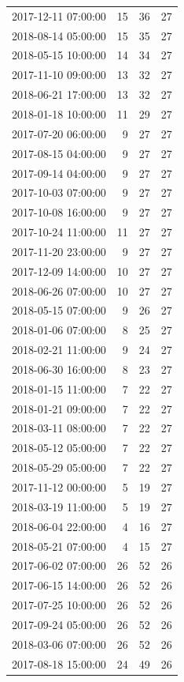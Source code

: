 \begin{tabular}{lrrr}
2017-12-11 07:00:00 & 15 & 36 & 27 \\
2018-08-14 05:00:00 & 15 & 35 & 27 \\
2018-05-15 10:00:00 & 14 & 34 & 27 \\
2017-11-10 09:00:00 & 13 & 32 & 27 \\
2018-06-21 17:00:00 & 13 & 32 & 27 \\
2018-01-18 10:00:00 & 11 & 29 & 27 \\
2017-07-20 06:00:00 & 9 & 27 & 27 \\
2017-08-15 04:00:00 & 9 & 27 & 27 \\
2017-09-14 04:00:00 & 9 & 27 & 27 \\
2017-10-03 07:00:00 & 9 & 27 & 27 \\
2017-10-08 16:00:00 & 9 & 27 & 27 \\
2017-10-24 11:00:00 & 11 & 27 & 27 \\
2017-11-20 23:00:00 & 9 & 27 & 27 \\
2017-12-09 14:00:00 & 10 & 27 & 27 \\
2018-06-26 07:00:00 & 10 & 27 & 27 \\
2018-05-15 07:00:00 & 9 & 26 & 27 \\
2018-01-06 07:00:00 & 8 & 25 & 27 \\
2018-02-21 11:00:00 & 9 & 24 & 27 \\
2018-06-30 16:00:00 & 8 & 23 & 27 \\
2018-01-15 11:00:00 & 7 & 22 & 27 \\
2018-01-21 09:00:00 & 7 & 22 & 27 \\
2018-03-11 08:00:00 & 7 & 22 & 27 \\
2018-05-12 05:00:00 & 7 & 22 & 27 \\
2018-05-29 05:00:00 & 7 & 22 & 27 \\
2017-11-12 00:00:00 & 5 & 19 & 27 \\
2018-03-19 11:00:00 & 5 & 19 & 27 \\
2018-06-04 22:00:00 & 4 & 16 & 27 \\
2018-05-21 07:00:00 & 4 & 15 & 27 \\
2017-06-02 07:00:00 & 26 & 52 & 26 \\
2017-06-15 14:00:00 & 26 & 52 & 26 \\
2017-07-25 10:00:00 & 26 & 52 & 26 \\
2017-09-24 05:00:00 & 26 & 52 & 26 \\
2018-03-06 07:00:00 & 26 & 52 & 26 \\
2017-08-18 15:00:00 & 24 & 49 & 26 \\

\end{tabular}
